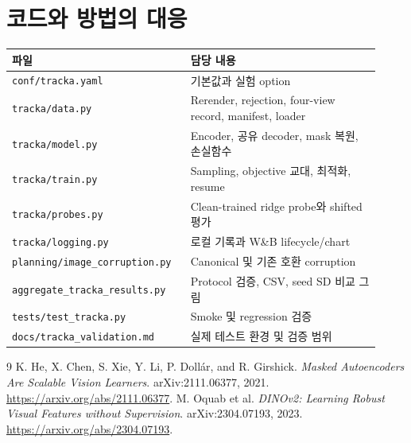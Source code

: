 \documentclass[11pt,a4paper]{article}
\newcommand{\code}[1]{\nolinkurl{#1}}
\begin{document}
\section{코드와 방법의 대응}
\begin{longtable}{p{0.43\linewidth}p{0.49\linewidth}}
\toprule 파일 & 담당 내용 \\\midrule\endhead
\code{conf/tracka.yaml} & 기본값과 실험 option \\
\code{tracka/data.py} & Rerender, rejection, four-view record, manifest, loader \\
\code{tracka/model.py} & Encoder, 공유 decoder, mask 복원, 손실함수 \\
\code{tracka/train.py} & Sampling, objective 교대, 최적화, resume \\
\code{tracka/probes.py} & Clean-trained ridge probe와 shifted 평가 \\
\code{tracka/logging.py} & 로컬 기록과 W\&B lifecycle/chart \\
\code{planning/image_corruption.py} & Canonical 및 기존 호환 corruption \\
\code{aggregate_tracka_results.py} & Protocol 검증, CSV, seed SD 비교 그림 \\
\code{tests/test_tracka.py} & Smoke 및 regression 검증 \\
\code{docs/tracka_validation.md} & 실제 테스트 환경 및 검증 범위 \\\bottomrule
\end{longtable}

\begin{thebibliography}{9}
 K. He, X. Chen, S. Xie, Y. Li, P. Doll\'ar, and R. Girshick.
\emph{Masked Autoencoders Are Scalable Vision Learners}. arXiv:2111.06377, 2021.
\url{https://arxiv.org/abs/2111.06377}.
 M. Oquab et al.
\emph{DINOv2: Learning Robust Visual Features without Supervision}.
arXiv:2304.07193, 2023.
\url{https://arxiv.org/abs/2304.07193}.
\end{thebibliography}
\end{document}
